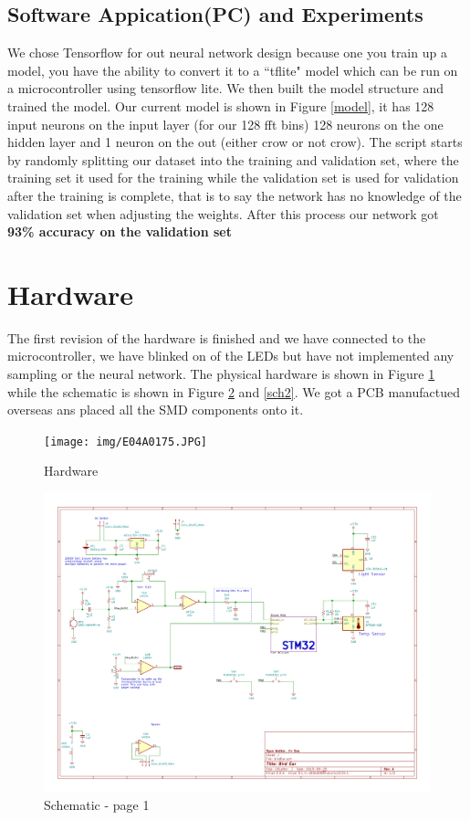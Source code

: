 \documentclass{article}
\begin{document}
\subsection{Software Appication(PC) and Experiments}
We chose Tensorflow for out neural network design because one you train up a model, you have the ability to convert it to a ``tflite" model which can be run on a microcontroller using tensorflow lite. We then built the model structure and trained the model. Our current model is shown in Figure \ref{model}, it has 128 input neurons on the input layer (for our 128 fft bins) 128 neurons on the one hidden layer and 1 neuron on the out (either crow or not crow). The script starts by randomly splitting our dataset into the training and validation set, where the training set it used for the training while the validation set is used for validation after the training is complete, that is to say the network has no knowledge of the validation set when adjusting the weights. After this process our network got \textbf{93\% accuracy on the validation set}

\section{Hardware}
The first revision of the hardware is finished and we have connected to the microcontroller, we have blinked on of the LEDs but have not implemented any sampling or the neural network. The physical hardware is shown in Figure \ref{hardware} while the schematic is shown in Figure \ref{sch1} and \ref{sch2}. We got a PCB manufactued overseas ans placed all the SMD components onto it.
 
\begin{figure}[H]
\centering
\texttt{[image: img/E04A0175.JPG]}
\caption{Hardware}
\label{hardware}
\end{figure}

\begin{figure}[H]
\centering
\includegraphics[scale=0.7, angle=90, page=1]{../birdEar/plot/birdEar.pdf}
\caption{Schematic - page 1}
\label{sch1}
\end{figure}
\end{document}
